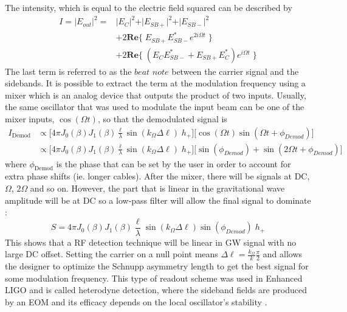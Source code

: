 		The	intensity, which is equal to the electric field squared can be described by
		\begin{equation}\label{RFdet}
		\begin{aligned}
			I	= \vert E_{out} \vert^2  =	&\vert E_{C}\vert^2 + \vert E_{SB+}\vert^2 + \vert E_{SB-}\vert^2 \\
										  	& + 2 \mathbf{Re} \{ \; E_{SB+} E^*_{SB-} e^{2i\Omega t} \; \}\\
										  	& + 2 \mathbf{Re} \{ \; (E_{C} E^*_{SB-} +  E_{SB+} E^*_{C} ) e^{i\Omega t} \; \}
		\end{aligned}
		\end{equation}
		The last term is referred to as the $beat$ $note$ between the carrier signal and the sidebands.  It is possible to extract the term at the modulation frequency using a mixer which is an analog device that outputs the product of two inputs. Usually, the same oscillator that was used to modulate the input beam can be one of the mixer inputs, $\cos(\Omega t)$,  so that the demodulated signal is
		\begin{equation}
		\begin{aligned}
		I_{\text{Demod}} 	&\propto \big[ 4 \pi  J_0(\beta) J_1(\beta) \frac{\ell}{\lambda}  \sin(k_{\Omega} \Delta \ell)  \; h_{+}\big] \big[ \cos(\Omega t)  \sin(\Omega t + \phi_{Demod}) \big] \\
					&\propto \big[ 4 \pi  J_0(\beta) J_1(\beta) \frac{\ell}{\lambda}  \sin(k_{\Omega} \Delta \ell)  \; h_{+}\big] \big[ \sin(\phi_{Demod}) + \sin(2\Omega t + \phi_{Demod}) \big]
		\end{aligned}
		\end{equation}
		where $\phi_{\text{Demod}}$ is the phase that can be set by the user in order to account for extra phase shifts (ie. longer cables). After the mixer, there will be signals at DC, $\Omega$, $2\Omega$ and so on. However, the part that is linear in the gravitational wave amplitude will be at DC so a low-pass filter will allow the final signal to dominate \cite{BlackPDH}:
		\begin{equation}\label{eq:SM_hetero}
		S = 4 \pi  J_0(\beta) J_1(\beta) \frac{\ell}{\lambda}  \sin(k_{\Omega} \Delta \ell) \sin(\phi_{Demod}) \; h_{+}
		\end{equation}
		This shows that a RF detection technique will be linear in GW signal with no large DC offset. Setting the carrier on a null point means $\Delta \ell = \frac{k_{\Omega}}{k} \frac{\pi}{2}$ and allows the designer to optimize the Schnupp asymmetry length to get the best signal for some modulation frequency. This type of readout scheme was used in Enhanced LIGO and is called heterodyne detection, where the sideband fields are produced by an EOM and its efficacy depends on the local oscillator's stability \cite{FritschelReadout}.  
